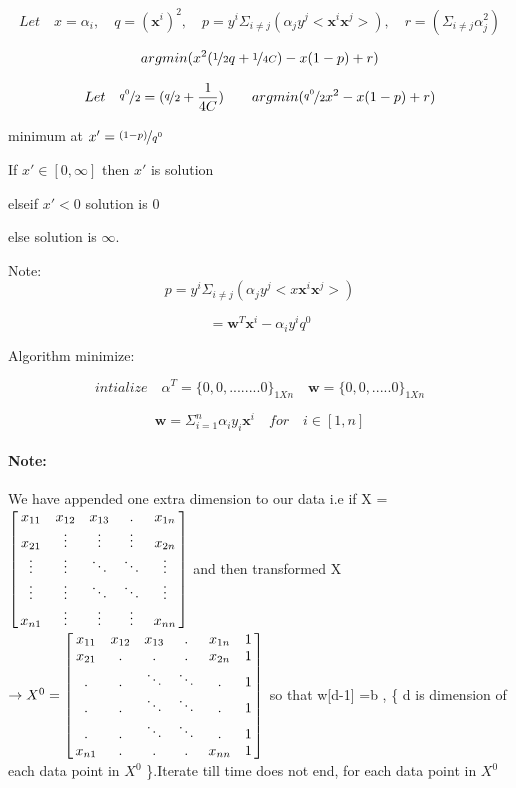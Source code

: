 \documentclass{article}
\begin{document}
\[ Let \quad  x = \alpha _i , \quad q = ( \textbf{x} ^i ) ^2 , \quad p = y^i\Sigma _{i \neq j}  (  \alpha _j  y^j< \textbf{x}^i \textbf{x}^j>) , \quad r = (\Sigma _{i \neq j}   \alpha _j ^2) \]


\[  argmin(x^2( \nicefrac{1}{2} q + \nicefrac{1}{4C}) - x(1-p) + r ) \]

\[ Let \quad \nicefrac{ q ^0 }{2} = ( \nicefrac{q}{2} + \frac{1}{4C} ) \qquad    argmin( \nicefrac{ q ^0}{2} x^2 - x(1-p) + r ) \]




  minimum at $ x' = \nicefrac{ (1-p) }{ q^0 } $

  
  If $ x' \in [0,\infty] $ then $ x' $ is solution
  
   elseif $ x' < 0 $ solution is 0
   
    else solution is  $ \infty $.
  
  
Note: 
\[ p = y^i\Sigma _{i \neq j}  (  \alpha _j  y^j < x\textbf{x}^i \textbf{x}^j > ) \]

\[ = \textbf{w} ^T \textbf{x} ^i - \alpha _i  y^i q^0 \]

Algorithm minimize:

\[ intialize  \quad  \alpha  ^ T  =  \{ 0,0,........0 \}  _{ 1Xn } \quad \textbf{w} = \{ 0,0, .....0 \} _{1Xn} \]

\[ { \textbf{w} = \Sigma _{i=1} ^n \alpha _i y_i \textbf{x} ^i } \quad for \quad i \in [1,n] \]


\paragraph{Note:} We have appended one extra dimension to our data i.e if X = $ \left[ \begin{array}{@{\,} ccccc @{\,}}
    x_{11}	& x_{12} & x_{13} & . & x_{1n}  \\
    x_{21} & \vdots & \vdots & \vdots  & x_{2n} \\
    \vdots & \vdots & \ddots & \ddots & \vdots \\
    \vdots & \vdots & \ddots & \ddots & \vdots \\
    x_{n1} & \vdots & \vdots & \vdots  & x_{nn} 
  \end{array} \right] $
 and then transformed  X $ \rightarrow X^0 = \left[ \begin{array}{@{\,} cccccc @{\,}}
    x_{11} & x_{12} & x_{13} &  .& x_{1n} & 1  \\
    x_{21} & . & . & . & x_{2n} & 1\\
    . & . & \ddots & \ddots & . & 1\\
    . & . & \ddots & \ddots& . & 1\\
    . & . & \ddots & \ddots& . & 1\\
    x_{n1} & . & . & .  & x_{nn} & 1\\
  \end{array} \right] $ so that w[d-1] =b , \{ d is dimension of each data point in $ X^0 $ \}.Iterate till time does not end, for each data point in $ X^0 $ 
 
\end{document}
